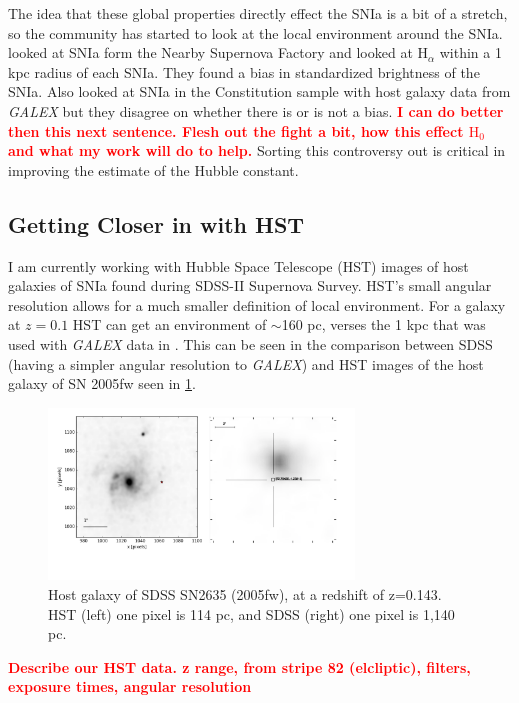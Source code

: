 \documentclass[apj, iop]{emulateapj}
\newcommand{\sn}{SNIa}
\newcommand{\todo}[1]{\textbf{\textcolor{red}{#1}}}
\newcommand{\Hubble}{\ensuremath{\text{H}_0}}
\begin{document}
The idea that these global properties directly effect the \sn{} is a bit of a
stretch, so the community has started to look at the local environment around
the \sn{}. \cite{Rigault13} looked at \sn{} form the Nearby Supernova Factory
and looked at H$_{\alpha}$ within a 1 kpc radius of each \sn{}. They found  a
bias in standardized brightness of the \sn{}. Also \cite{Rigault15, Jones15}
looked at \sn{} in the Constitution sample with host galaxy data from {\it
GALEX} but they disagree on whether there is or is not a bias. \todo{I can do
better then  this next sentence. Flesh out the fight a bit, how this effect
\Hubble{} and what my work will do to help.} Sorting this controversy out is
critical in improving the estimate of the Hubble constant.

\subsection{Getting Closer in with HST}\label{hst}

I am currently working with Hubble Space Telescope (HST) images of host galaxies
of \sn{} found during SDSS-II Supernova Survey. HST's small angular resolution
allows for a much smaller definition of local environment. For a galaxy at $z =
0.1$ HST can get an environment of $\sim$160 pc, verses the 1 kpc that was used
with {\it GALEX} data in \cite{Jones15,Rigault15}. This can be seen in the
comparison between SDSS (having a simpler angular resolution to {\it GALEX}) and
HST images of the host galaxy of SN 2005fw seen in \cref{f:galaxy-compare}.

\begin{figure}
	\includegraphics[width=3.2in]{SN2635-combined-inverted.pdf}
	\caption{Host galaxy of SDSS SN2635 (2005fw), at a redshift of z=0.143. HST 
	(left) one pixel is 114 pc, and SDSS (right) one pixel is 1,140 pc.}
	\label{f:galaxy-compare}
\end{figure}

\todo{Describe our HST data. z range, from stripe 82 (elcliptic), filters,
exposure times, angular resolution}
\end{document}
